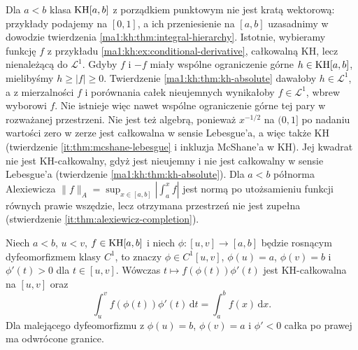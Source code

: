 \begin{uwaga}
Dla $a<b$ klasa $\mathrm{KH}[a,b]$ z porządkiem punktowym
nie jest kratą wektorową: przykłady podajemy na $[0,1]$,
a ich przeniesienie na $[a,b]$ uzasadnimy w dowodzie
twierdzenia \ref{ma1:kh:thm:integral-hierarchy}. Istotnie, wybieramy funkcję $f$ z przykładu
\ref{ma1:kh:ex:conditional-derivative}, całkowalną KH,
lecz nienależącą do $\mathcal L^1$.
Gdyby $f$ i $-f$ miały wspólne ograniczenie górne
$h\in\mathrm{KH}[a,b]$, mielibyśmy $h\ge |f|\ge0$.
Twierdzenie \ref{ma1:kh:thm:kh-absolute} dawałoby
$h\in\mathcal L^1$, a z mierzalności $f$ i porównania
całek nieujemnych wynikałoby $f\in\mathcal L^1$,
wbrew wyborowi $f$. Nie istnieje więc nawet wspólne
ograniczenie górne tej pary w rozważanej przestrzeni. Nie jest też algebrą, ponieważ $x^{-1/2}$ na $(0,1]$ po nadaniu wartości zero w zerze jest całkowalna
w sensie Lebesgue'a, a więc także KH
(twierdzenie \ref{it:thm:mcshane-lebesgue} i inkluzja
McShane'a w KH). Jej kwadrat nie jest KH-całkowalny,
gdyż jest nieujemny i nie jest całkowalny w sensie
Lebesgue'a (twierdzenie \ref{ma1:kh:thm:kh-absolute}). Dla $a<b$ półnorma Alexiewicza $\|f\|_A=\sup_{x\in[a,b]}\left|\int_a^x f\right|$ jest normą po utożsamieniu funkcji równych prawie wszędzie, lecz otrzymana przestrzeń nie jest zupełna
(stwierdzenie \ref{it:thm:alexiewicz-completion}).
\end{uwaga}
\begin{twierdzenie}\label{ma1:kh:tw:hk-podstawienie}\label{tw:hk-podstawienie}
Niech $a<b$, $u<v$, $f\in\mathrm{KH}[a,b]$ i niech $\phi:[u,v]\to[a,b]$ będzie rosnącym dyfeomorfizmem klasy $C^1$, to znaczy $\phi\in C^1[u,v]$, $\phi(u)=a$, $\phi(v)=b$ i $\phi'(t)>0$ dla $t\in[u,v]$. Wówczas $t\mapsto f(\phi(t))\phi'(t)$ jest KH-całkowalna na $[u,v]$ oraz
\[
\int_u^v f(\phi(t))\phi'(t)\,\mathrm dt=\int_a^b f(x)\,\mathrm dx.
\]
Dla malejącego dyfeomorfizmu z $\phi(u)=b$, $\phi(v)=a$ i $\phi'<0$ całka po prawej ma odwrócone granice.
\end{twierdzenie}

